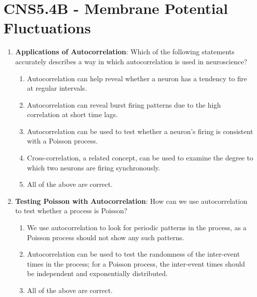 \documentclass[11pt,letterpaper]{article}
\begin{document}
\section{CNS5.4B - Membrane Potential Fluctuations}
\begin{enumerate}
    \item \textbf{Applications of Autocorrelation}: Which of the following statements accurately describes a way in which autocorrelation is used in neuroscience?
    \begin{enumerate}
        \item Autocorrelation can help reveal whether a neuron has a tendency to fire at regular intervals.
        \item Autocorrelation can reveal burst firing patterns due to the high correlation at short time lags.
        \item Autocorrelation can be used to test whether a neuron's firing is consistent with a Poisson process.
        \item Cross-correlation, a related concept, can be used to examine the degree to which two neurons are firing synchronously.
        \item All of the above are correct.
    \end{enumerate}

    \item \textbf{Testing Poisson with Autocorrelation}: How can we use autocorrelation to test whether a process is Poisson?
    \begin{enumerate}
        \item We use autocorrelation to look for periodic patterns in the process, as a Poisson process should not show any such patterns.
        \item Autocorrelation can be used to test the randomness of the inter-event times in the process; for a Poisson process, the inter-event times should be independent and exponentially distributed.
        \item All of the above are correct.
    \end{enumerate}


\end{enumerate}
\end{document}
